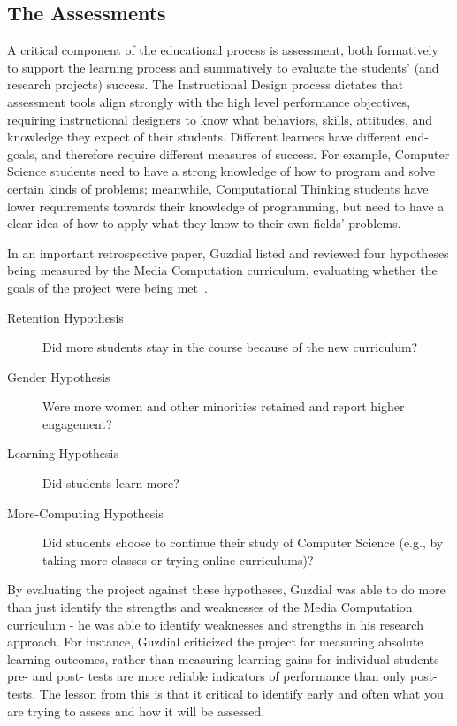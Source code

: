 \subsection{The Assessments}

A critical component of the educational process is assessment, both formatively to support the learning process and summatively to evaluate the students' (and research projects) success.
The Instructional Design process dictates that assessment tools align strongly with the high level performance objectives, requiring instructional designers to know what behaviors, skills, attitudes, and knowledge they expect of their students.
Different learners have different end-goals, and therefore require different measures of success.
For example, Computer Science students need to have a strong knowledge of how to program and solve certain kinds of problems; meanwhile, Computational Thinking students have lower requirements towards their knowledge of programming, but need to have a clear idea of how to apply what they know to their own fields' problems.

In an important retrospective paper, Guzdial listed and reviewed four hypotheses being measured by the Media Computation curriculum, evaluating whether the goals of the project were being met~\cite{Guzdial:2013:EHM:2493394.2493397}.
\begin{description}
	\item[Retention Hypothesis] Did more students stay in the course because of the new curriculum?
	\item[Gender Hypothesis] Were more women and other minorities retained and report higher engagement?
	\item[Learning Hypothesis] Did students learn more?
	\item[More-Computing Hypothesis] Did students choose to continue their study of Computer Science (e.g., by taking more classes or trying online curriculums)?
\end{description}
By evaluating the project against these hypotheses, Guzdial was able to do more than just identify the strengths and weaknesses of the Media Computation curriculum - he was able to identify weaknesses and strengths in his research approach.
For instance, Guzdial criticized the project for measuring absolute learning outcomes, rather than measuring learning gains for individual students -- pre- and post- tests are more reliable indicators of performance than only post- tests.
The lesson from this is that it critical to identify early and often what you are trying to assess and how it will be assessed.

